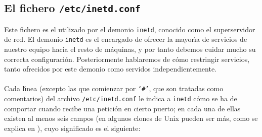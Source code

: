 \subsection{El fichero {\tt /etc/inetd.conf}}
Este fichero es el utilizado por el demonio {\tt inetd}, conocido como el
superservidor de red. El demonio {\tt inetd} es el encargado de ofrecer la
mayor\'{\i}a de servicios de nuestro equipo hacia el resto de m\'aquinas, y
por tanto debemos cuidar mucho su correcta configuraci\'on. Posteriormente 
hablaremos de c\'omo restringir servicios, tanto ofrecidos por este demonio como
servidos independientemente.\\
\\Cada l\'{\i}nea (excepto las que comienzar por {\tt `\#'}, que son tratadas
como comentarios) del archivo {\tt /etc/inetd.conf} le indica a {\tt inetd} 
c\'omo se ha de comportar cuando recibe una petici\'on en cierto puerto; en cada
una de ellas existen al menos seis campos (en algunos clones de Unix pueden ser 
m\'as, como se explica en \cite{kn:siy95}), cuyo significado es el 
siguiente:

